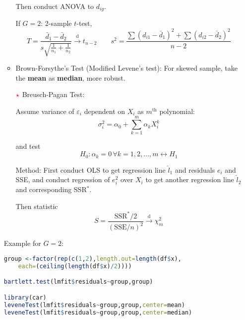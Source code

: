 \begin{itemize}[topsep=2pt,itemsep=2pt]
\begin{itemize}[topsep=2pt,itemsep=2pt]
        Then conduct ANOVA to $ d_{ig} $.

        If $ G=2 $: 2-sample $ t $-test,
        \begin{equation}
            T=\dfrac{\bar{d}_1-\bar{d}_2}{s\sqrt{\frac{1}{n_1}+\frac{1}{n_2}}}\xrightarrow[]{\mathrm{d}} t_{n-2}\qquad s^2=\dfrac{\sum(d_{i1}-\bar{d}_1)^2+\sum(d_{i2}-\bar{d}_2 )^2}{n-2}
        \end{equation}
        

        
        
        \item Brown-Forsythe's Test (Modified Levene's test): For skewed sample, take the \textbf{mean} as \textbf{median}, more robust. 


        \item[$ {\color{red}\star} $] Breusch-Pagan Test:
        
        Assume variance of $ \varepsilon _i $ dependent on $ X_i $ as $ m^{\mathrm{th}} $ polynomial:
        \begin{equation}
            \sigma_i^2=\alpha _0+\sum_{k=1}^m\alpha _kX_i^k
        \end{equation}
        
        and test 
        \begin{equation}
            H_0:\alpha _k=0\,\forall k=1,2,\ldots,m\longleftrightarrow H_1 
        \end{equation}

        Method: First conduct OLS to get regression line $ \hat{l}_1 $ and residuals $ e_i $ and SSE, and conduct regression of $ e_i^2 $ over $ X_i $ to get another regression line $ \hat{l}_2 $ and corresponding SSR$ ^* $.

        Then statistic
        \begin{equation}
            S=\dfrac{\mathrm{SSR^*}/2}{(\mathrm{SSE}/n)^2}\xrightarrow[]{\mathrm{d}} \chi^2_m
        \end{equation}
        
    \end{itemize}
\begin{rcode}
    Example for $ G=2 $:
\begin{lstlisting}[language=R]
group <-factor(rep(c(1,2),length.out=length(df$x),
    each=(ceiling(length(df$x)/2))))

bartlett.test(lmfit$residuals~group,group)

library(car)
leveneTest(lmfit$residuals~group,group,center=mean)
leveneTest(lmfit$residuals~group,group,center=median)


\end{lstlisting}
\end{rcode}
\end{itemize}

